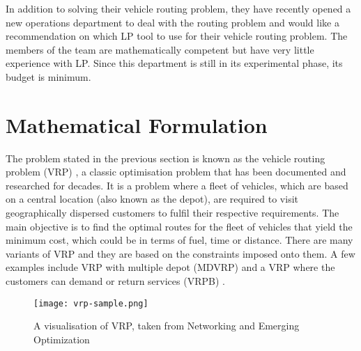 In addition to solving their vehicle routing problem, they have recently opened a new operations department to deal with the routing problem
 and would like a recommendation on which LP tool to use for their vehicle routing problem. The members of the team are
 mathematically competent but have very little experience with LP. Since this department is still in its
 experimental phase, its budget is minimum.

\section{Mathematical Formulation}
The problem stated in the previous section is known as the vehicle routing problem (VRP) \cite{Dantzig1959, Daneshzand2011},
a classic optimisation problem that has been documented and researched for decades. It is a problem where a fleet of vehicles,
which are based on a central location (also known as the depot), are required to visit geographically dispersed customers
 to fulfil their respective requirements. The main objective is to find the optimal routes for the fleet of vehicles that
 yield the minimum cost, which could be in terms of fuel, time or distance. There are many variants of VRP and they are based
 on the constraints imposed onto them. A few examples include VRP with multiple depot (MDVRP) \cite{Daneshzand2011} and a VRP where the
 customers can demand or return services (VRPB) \cite{Daneshzand2011}.
\begin{figure}[!ht]
  \centering
    \texttt{[image: vrp-sample.png]}
    \caption{A visualisation of VRP, taken from Networking and Emerging Optimization \cite{neo:vrp}}
\end{figure}

